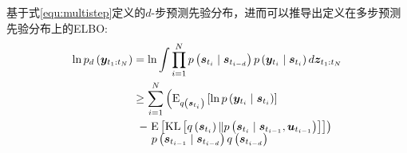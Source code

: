 基于式\eqref{equ:multistep}定义的$d$-步预测先验分布，进而可以推导出定义在多步预测先验分布上的ELBO:
\begin{equation}
\begin{aligned} \ln p_d\left(\boldsymbol{y}_{t_{1}: t_{N}}\right)&=\ln \int \prod_{i=1}^{N} p\left(\boldsymbol{s}_{t_{i}} \mid \boldsymbol{s}_{t_{i-d}} \right) p\left(\boldsymbol{y}_{t_{i}} \mid \boldsymbol{s}_{t_{i}}\right) d \boldsymbol{z}_{t_{1}: t_{N}} \\ 
& \geq\sum_{i=1}^{N}\left(\mathrm{E}_{q\left(\boldsymbol{s}_{t_{i}}\right)}\left[\ln p\left(\boldsymbol{y}_{t_{i}} \mid \boldsymbol{s}_{t_{i}}\right)\right]\right.\\
&\hspace{-1ex}\quad\begin{aligned}
-&\left.\mathrm{E}\left[\operatorname{KL}\left[q\left(\boldsymbol{s}_{t_{i}}\right)\| p\left(\boldsymbol{s}_{t_{i}} \mid \boldsymbol{s}_{t_{i-1}},\boldsymbol{u}_{t_{i-1}}\right)\right]\right]\right)\\[-5pt]
&\ \tiny{p\left(\boldsymbol{s}_{t_{i-1}} \mid \boldsymbol{s}_{t_{i-d}}\right){q\left(\boldsymbol{s}_{t_{i-d}}\right)}}
\end{aligned}
\end{aligned}
\label{equ:loss_multi}
\end{equation}

